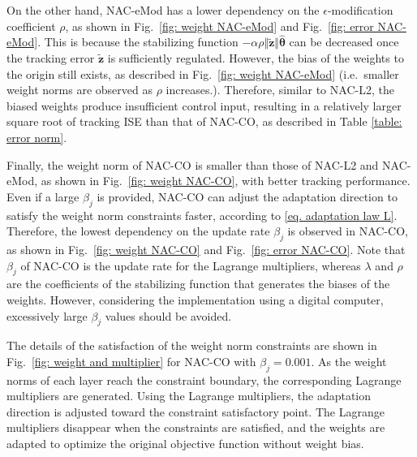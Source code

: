 \documentclass[letterpaper, 10 pt, conference]{ieeeconf}  %
\newcommand\ie{\textrm{i.e.\ }}
\newcommand*{\mv}[1]{\boldsymbol{#1}}
\begin{document}
On the other hand, NAC-eMod has a lower dependency on the $\epsilon$-modification coefficient $\rho$, as shown in Fig.~\ref{fig: weight NAC-eMod} and Fig.~\ref{fig: error NAC-eMod}.
This is because the stabilizing function $-\alpha\rho\Vert\tilde {\mv z}\Vert{\hat{\mv\theta}}$ can be decreased once the tracking error $\tilde {\mv z}$ is sufficiently regulated.
However, the bias of the weights to the origin still exists, as described in Fig.~\ref{fig: weight NAC-eMod} (\ie smaller weight norms are observed as $\rho$ increases.).
Therefore, similar to NAC-L2, the biased weights produce insufficient control input, resulting in a relatively larger square root of tracking ISE than that of NAC-CO, as described in Table \ref{table: error norm}.

Finally, the weight norm of NAC-CO is smaller than those of NAC-L2 and NAC-eMod, as shown in Fig.~\ref{fig: weight NAC-CO}, with better tracking performance.
Even if a large $\beta_j$ is provided, NAC-CO can adjust the adaptation direction to satisfy the weight norm constraints faster, according to \eqref{eq. adaptation law L}.
Therefore, the lowest dependency on the update rate $\beta_j$ is observed in NAC-CO, as shown in Fig.~\ref{fig: weight NAC-CO} and Fig.~\ref{fig: error NAC-CO}.
Note that $\beta_j$ of NAC-CO is the update rate for the Lagrange multipliers, whereas $\lambda$ and $\rho$ are the coefficients of the stabilizing function that generates the biases of the weights.
However, considering the implementation using a digital computer, excessively large $\beta_j$ values should be avoided.

The details of the satisfaction of the weight norm constraints are shown in Fig.~\ref{fig: weight and multiplier} for NAC-CO with $\beta_j=0.001$.
As the weight norms of each layer reach the constraint boundary, the corresponding Lagrange multipliers are generated.
Using the Lagrange multipliers, the adaptation direction is adjusted toward the constraint satisfactory point.
The Lagrange multipliers disappear when the constraints are satisfied, and the weights are adapted to optimize the original objective function without weight bias.
\end{document}
